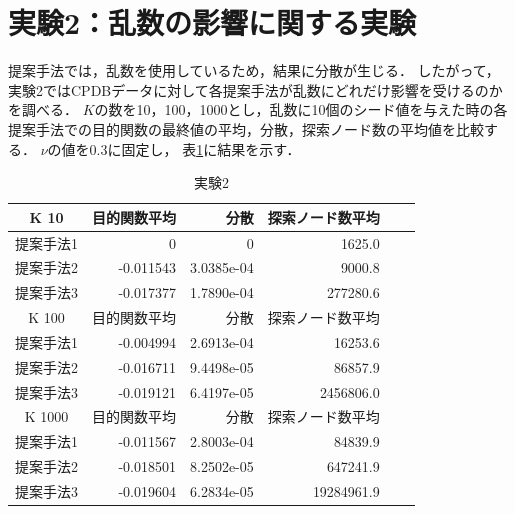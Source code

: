 \section{実験2：乱数の影響に関する実験}
提案手法では，乱数を使用しているため，結果に分散が生じる．
したがって，実験2ではCPDBデータに対して各提案手法が乱数にどれだけ影響を受けるのかを調べる．
$K$の数を10，100，1000とし，乱数に10個のシード値を与えた時の各提案手法での目的関数の最終値の平均，分散，探索ノード数の平均値を比較する．
$\nu$の値を0.3に固定し，
表\ref{randomseed}に結果を示す．
\begin{table}[t]
	\centering
	\begin{tabular}{|c|r|r|r|r|r|}
		\hline
		K 10 & 目的関数平均 & 分散 & 探索ノード数平均 \\
		\hline \hline
		提案手法1  & 0 & 0 & 1625.0 \\
		\hline
		提案手法2  & -0.011543 & 3.0385e-04 & 9000.8 \\
		\hline
		提案手法3  & -0.017377 & 1.7890e-04 & 277280.6 \\
		\hline
		\hline
		K 100 & 目的関数平均 & 分散 & 探索ノード数平均 \\
		\hline \hline
		提案手法1  & -0.004994 & 2.6913e-04 & 16253.6 \\
		\hline
		提案手法2  & -0.016711 & 9.4498e-05 & 86857.9 \\
		\hline
		提案手法3  & -0.019121 & 6.4197e-05 & 2456806.0 \\
		\hline
		\hline
		K 1000 & 目的関数平均 & 分散 & 探索ノード数平均 \\
		\hline \hline
		提案手法1  & -0.011567 & 2.8003e-04 & 84839.9 \\
		\hline
		提案手法2  & -0.018501 & 8.2502e-05 & 647241.9 \\
		\hline
		提案手法3  & -0.019604 & 6.2834e-05 & 19284961.9 \\
		\hline
	\end{tabular}
	\caption{実験2}
	\label{randomseed}
\end{table}


